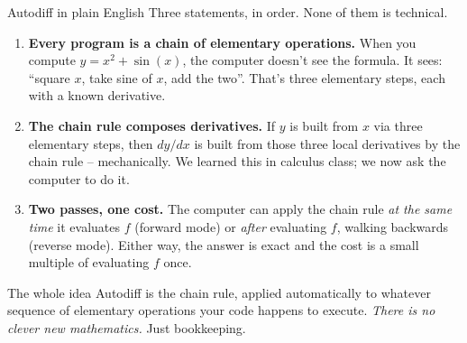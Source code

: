 \documentclass[aspectratio=169,11pt]{beamer}
\newcommand{\emphc}[1]{\textcolor{harvardcrimson}{#1}}
\begin{document}
\begin{frame}{Autodiff in plain English}
\small
Three statements, in order. None of them is technical.
\begin{enumerate}\itemsep4pt
\item \textbf{Every program is a chain of elementary operations.} When you compute $y = x^2 + \sin(x)$, the computer doesn't see the formula. It sees: ``square $x$, take sine of $x$, add the two''. That's three elementary steps, each with a known derivative.
\item \textbf{The chain rule composes derivatives.} If $y$ is built from $x$ via three elementary steps, then $dy/dx$ is built from those three local derivatives by the chain rule -- mechanically. We learned this in calculus class; we now ask the computer to do it.
\item \textbf{Two passes, one cost.} The computer can apply the chain rule \emph{at the same time} it evaluates $f$ (\emphc{forward mode}) or \emph{after} evaluating $f$, walking backwards (\emphc{reverse mode}). Either way, the answer is exact and the cost is a small multiple of evaluating $f$ once.
\end{enumerate}
\vspace{4pt}
\begin{block}{The whole idea}
\small Autodiff is the chain rule, applied automatically to whatever sequence of elementary operations your code happens to execute. \emph{There is no clever new mathematics.} Just bookkeeping.
\end{block}
\end{frame}
\end{document}
